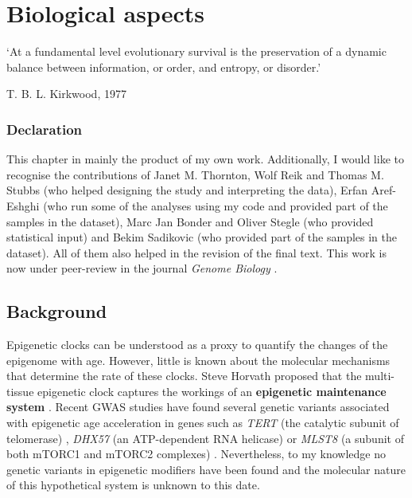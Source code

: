 
\chapter{Biological aspects}  \label{c:3}

\ifpdf
    \graphicspath{{Chapter3/Figs/Raster/}{Chapter3/Figs/PDF/}{Chapter3/Figs/}}
\else
    \graphicspath{{Chapter3/Figs/Vector/}{Chapter3/Figs/}}
\fi



\epigraph{`At a fundamental level evolutionary survival is the preservation of a dynamic balance between information, or order, and entropy, or disorder.'}{T. B. L. Kirkwood, 1977 \cite{Kirkwood1977}}


\subsection*{Declaration} 

\footnotesize

This chapter in mainly the product of my own work. Additionally, I would like to recognise the contributions of Janet M. Thornton, Wolf Reik and Thomas M. Stubbs (who helped designing the study and interpreting the data), Erfan Aref-Eshghi (who run some of the analyses using my code and provided part of the samples in the dataset), Marc Jan Bonder and Oliver Stegle (who provided statistical input) and Bekim Sadikovic (who provided part of the samples in the dataset). All of them also helped in the revision of the final text. This work is now under peer-review in the journal \textit{Genome Biology} \cite{Martin-Herranz2019a}.

\normalsize

\section{Background} 

\smallskip

Epigenetic clocks can be understood as a proxy to quantify the changes of the epigenome with age. However, little is known about the molecular mechanisms that determine the rate of these clocks. Steve Horvath proposed that the multi-tissue epigenetic clock captures the workings of an \textbf{epigenetic maintenance system} \cite{Horvath2013}. Recent \acrshort{GWAS} studies have found several genetic variants associated with epigenetic age acceleration in genes such as \textit{TERT} (the catalytic subunit of telomerase) \cite{Lu2018}, \textit{DHX57} (an ATP-dependent RNA helicase) \cite{Lu2016} or \textit{MLST8} (a subunit of both mTORC1 and mTORC2 complexes) \cite{Lu2016}. Nevertheless, to my knowledge no genetic variants in epigenetic modifiers have been found and the molecular nature of this hypothetical system is unknown to this date.

